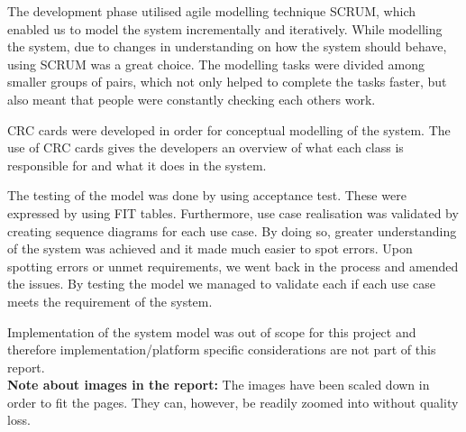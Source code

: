 The development phase utilised agile modelling technique SCRUM, which enabled us to model the system incrementally and iteratively. While modelling the system, due to changes in understanding on how the system should behave, using SCRUM was a great choice.  The modelling tasks were divided among smaller groups of pairs, which not only helped to complete the tasks faster, but also meant that people were constantly checking each others work. 

CRC cards were developed in order for conceptual modelling of the system. The use of CRC cards gives the developers an overview of what each class is responsible for and what it does in the system. 

The testing of the model was done by using acceptance test. These were expressed by using FIT tables. Furthermore, use case realisation was validated by creating sequence diagrams for each use case. By doing so, greater understanding of the system was achieved and it made much easier to spot errors. Upon spotting errors or unmet requirements, we went back in the process and amended the issues. By testing the model we managed to validate each if each use case meets the requirement of the system.

Implementation of the system model was out of scope for this project and therefore implementation/platform specific considerations are not part of this report.
\\

\textbf{Note about images in the report:} The images have been scaled down in order to fit the pages. They can, however, be readily zoomed into without quality loss.